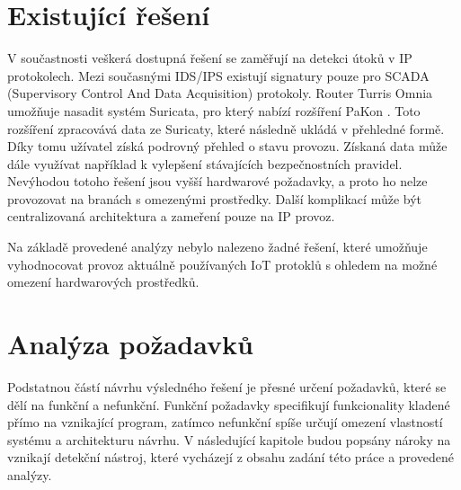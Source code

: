  \section{Existující řešení}
 V součastnosti veškerá dostupná řešení se zaměřují na detekci útoků v IP protokolech. Mezi 
 současnými IDS/IPS existují signatury pouze pro SCADA (Supervisory Control And Data Acquisition)
 protokoly. Router Turris Omnia umožňuje nasadit systém Suricata, pro který nabízí rozšíření 
 PaKon \cite{pakon}. Toto rozšíření zpracovává data ze Suricaty, které následně ukládá v přehledné formě.
 Díky tomu užívatel získá podrovný přehled o stavu provozu. Získaná data může dále využívat 
 například k vylepšení stávajících bezpečnostních pravidel. Nevýhodou totoho řešení jsou 
 vyšší hardwarové požadavky, a proto ho nelze provozovat na branách s omezenými 
 prostředky. Další komplikací může být centralizovaná architektura a zameření pouze na 
 IP provoz.
 
 Na základě provedené analýzy nebylo nalezeno žadné řešení, které umožňuje vyhodnocovat 
 provoz aktuálně používaných IoT protoklů s ohledem na možné omezení hardwarových
 prostředků.
 
 \newpage
 \section{Analýza požadavků}
 Podstatnou částí návrhu výsledného řešení je přesné určení požadavků, které se dělí na 
 funkční a nefunkční. Funkční požadavky specifikují funkcionality kladené přímo na vznikající
 program, zatímco nefunkční spíše určují omezení vlastností systému a architekturu návrhu. V 
 následující kapitole budou popsány nároky na vznikají detekční nástroj, které vycházejí z obsahu
 zadání této práce a provedené analýzy.
 
